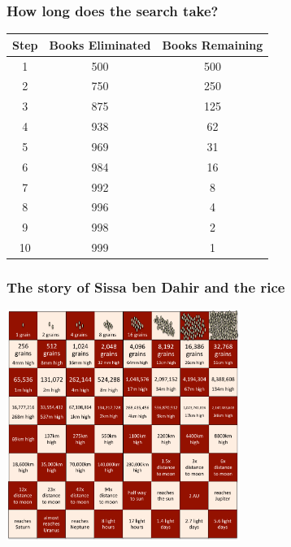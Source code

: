 \documentclass{beamer} %
\begin{document}
\begin{frame}
  \frametitle{How long does the search take?}
  \begin{center}
\begin{tabular}{ccc}
Step & Books Eliminated & Books Remaining\\
\hline
1 & 500 & 500\\
2 & 750 & 250\\
3 & 875 & 125\\
4 & 938 & 62\\
5 & 969 & 31\\
6 & 984 & 16\\
7 & 992 & 8\\
8 & 996 & 4\\
9 & 998 & 2\\
10 & 999 & 1
\end{tabular}
\end{center}
\end{frame}

\begin{frame}
  \frametitle{The story of Sissa ben Dahir and the rice}
  \centering
  \includegraphics[height=75mm]{assets/chessboard.pdf}
\end{frame}
\end{document}

